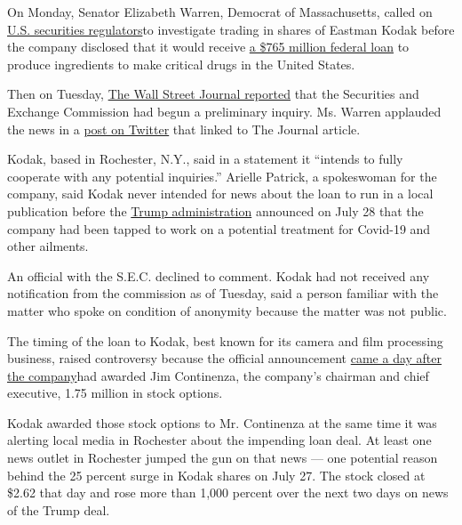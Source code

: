 On Monday, Senator Elizabeth Warren, Democrat of Massachusetts, called
on
\href{https://www.warren.senate.gov/imo/media/doc/2020.08.03\%20Letter\%20to\%20SEC\%20re\%20Kodak\%20stock\%20trades.pdf}{U.S.
securities regulators}to investigate trading in shares of Eastman Kodak
before the company disclosed that it would receive
\href{https://www.nytimes3xbfgragh.onion/live/2020/07/28/business/stock-market-today-coronavirus/the-united-states-will-lend-kodak-765-million-to-make-drug-components}{a
\$765 million federal loan} to produce ingredients to make critical
drugs in the United States.

Then on Tuesday,
\href{https://www.wsj.com/articles/kodak-loan-disclosure-and-stock-surge-under-sec-investigation-11596559126}{The
Wall Street Journal reported} that the Securities and Exchange
Commission had begun a preliminary inquiry. Ms. Warren applauded the
news in a
\href{https://twitter.com/SenWarren/status/1290697801882632193}{post on
Twitter} that linked to The Journal article.

Kodak, based in Rochester, N.Y., said in a statement it ``intends to
fully cooperate with any potential inquiries.'' Arielle Patrick, a
spokeswoman for the company, said Kodak never intended for news about
the loan to run in a local publication before the
\href{https://www.nytimes3xbfgragh.onion/live/2020/07/28/business/stock-market-today-coronavirus\#the-united-states-will-lend-kodak-765-million-to-make-drug-components}{Trump
administration} announced on July 28 that the company had been tapped to
work on a potential treatment for Covid-19 and other ailments.

An official with the S.E.C. declined to comment. Kodak had not received
any notification from the commission as of Tuesday, said a person
familiar with the matter who spoke on condition of anonymity because the
matter was not public.

The timing of the loan to Kodak, best known for its camera and film
processing business, raised controversy because the official
announcement
\href{https://www.nytimes3xbfgragh.onion/2020/07/31/business/kodak-ceo-stock-options.html}{came
a day after the company}had awarded Jim Continenza, the company's
chairman and chief executive, 1.75 million in stock options.

Kodak awarded those stock options to Mr. Continenza at the same time it
was alerting local media in Rochester about the impending loan deal. At
least one news outlet in Rochester jumped the gun on that news --- one
potential reason behind the 25 percent surge in Kodak shares on July 27.
The stock closed at \$2.62 that day and rose more than 1,000 percent
over the next two days on news of the Trump deal.

